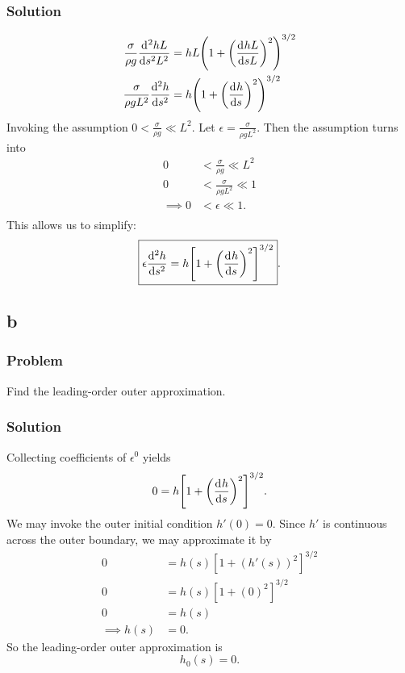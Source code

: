 \documentclass[12pt,twoside]{article}
\begin{document}
\subsubsection*{Solution}
\begin{equation*}
  \begin{aligned}
    \frac{\sigma}{\rho g}\od{^2hL}{s^2L^2} &= hL{\left( 1+{\left( \od{hL}{sL} \right)}^2 \right)}^{3/2} \\
    \frac{\sigma}{\rho g L^2}\od[2]{h}{s} &= h{\left( 1+{\left( \od{h}{s} \right)}^2 \right)}^{3/2} \\
  \end{aligned}
\end{equation*}
Invoking the assumption $0<\frac{\sigma}{\rho g}\ll L^2$. Let
$\epsilon=\frac{\sigma}{\rho g L^2}$. Then the assumption turns into
\begin{equation*}
  \begin{aligned}
    0 &< \frac{\sigma}{\rho g}\ll L^2 \\
    0 &< \frac{\sigma}{\rho g L^2}\ll 1 \\
    \implies 0 &< \epsilon\ll 1. \\
  \end{aligned}
\end{equation*}
This allows us to simplify:
\begin{equation*}
  \boxed{\epsilon\od[2]{h}{s} = h{\left[ 1 + {\left( \od{h}{s} \right)}^2 \right]}^{3/2}}.
\end{equation*}

\subsection{b}
\label{sec:minilab-part-b}
\subsubsection*{Problem}
Find the leading-order outer approximation.
\subsubsection*{Solution}
Collecting coefficients of $\epsilon^0$ yields
\begin{equation*}
  0 = h{\left[ 1 + {\left( \od{h}{s} \right)}^2 \right]}^{3/2}.
\end{equation*}
We may invoke the outer initial condition $h'(0)=0$. Since $h'$ is continuous
across the outer boundary, we may approximate it by
\begin{equation*}
  \begin{aligned}
    0 &= h(s){\left[ 1 + {\left( h'(s) \right)}^2 \right]}^{3/2} \\
    0 &= h(s){\left[ 1 + {\left( 0 \right)}^2 \right]}^{3/2} \\
    0 &= h(s) \\
    \implies h(s) &= 0.
  \end{aligned}
\end{equation*}
So the leading-order outer approximation is
\begin{equation*}
  \boxed{h_0(s)=0.}
\end{equation*}
\end{document}
